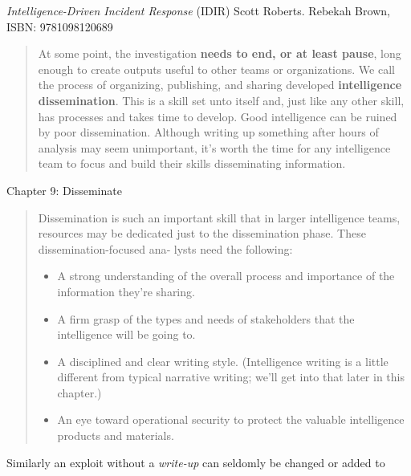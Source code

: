 \documentclass[Screen16to9,17pt]{foils}
\begin{document}

\emph{Intelligence-Driven Incident Response} (IDIR)
 Scott Roberts. Rebekah Brown, ISBN: 9781098120689

\begin{quote}
At some point, the investigation {\bf needs to end, or at least pause}, long enough to create outputs useful to other teams or organizations. We call the process of organizing, publishing, and sharing developed {\bf intelligence dissemination}. This is a skill set unto itself and, just like any other skill, has processes and takes time to develop. Good intelligence can be ruined by poor dissemination. Although writing up something after hours of analysis may seem unimportant, it’s worth the time for any intelligence team to focus and build their skills disseminating information.
\end{quote}

\begin{list2}
\item Chapter 9: Disseminate
\end{list2}



\begin{quote}
Dissemination is such an important skill that in larger intelligence teams, resources
may be dedicated just to the dissemination phase. These dissemination-focused ana‐
lysts need the following:
\begin{itemize}
\item A strong understanding of the overall process and importance of the information
they’re sharing.
\item A firm grasp of the types and needs of stakeholders that the intelligence will be
going to.
\item A disciplined and clear writing style. (Intelligence writing is a little different from typical narrative writing; we’ll get into that later in this chapter.)
\item An eye toward operational security to protect the valuable intelligence products
and materials.
\end{itemize}
\end{quote}

\begin{list2}
\item Similarly an exploit without a \emph{write-up} can seldomly be changed or added to
\end{list2}
\end{document}
